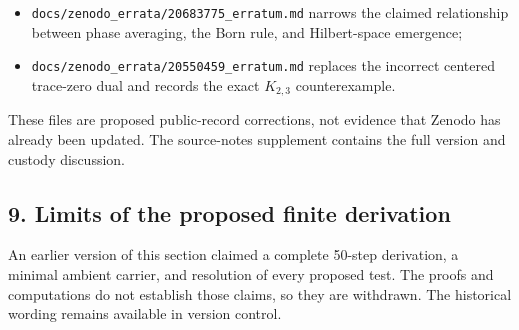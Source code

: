 \documentclass[
  11pt,
]{article}
\providecommand{\tightlist}{%
  \setlength{\itemsep}{0pt}\setlength{\parskip}{0pt}}
\begin{document}
\begin{itemize}
\tightlist
\item
  \texttt{d\allowbreak{}o\allowbreak{}c\allowbreak{}s\allowbreak{}/\allowbreak{}z\allowbreak{}e\allowbreak{}n\allowbreak{}o\allowbreak{}d\allowbreak{}o\allowbreak{}\_\allowbreak{}e\allowbreak{}r\allowbreak{}r\allowbreak{}a\allowbreak{}t\allowbreak{}a\allowbreak{}/\allowbreak{}2\allowbreak{}0\allowbreak{}6\allowbreak{}8\allowbreak{}3\allowbreak{}7\allowbreak{}7\allowbreak{}5\allowbreak{}\_\allowbreak{}e\allowbreak{}r\allowbreak{}r\allowbreak{}a\allowbreak{}t\allowbreak{}u\allowbreak{}m\allowbreak{}.\allowbreak{}m\allowbreak{}d}
  narrows the claimed relationship between phase averaging, the Born
  rule, and Hilbert-space emergence;
\item
  \texttt{d\allowbreak{}o\allowbreak{}c\allowbreak{}s\allowbreak{}/\allowbreak{}z\allowbreak{}e\allowbreak{}n\allowbreak{}o\allowbreak{}d\allowbreak{}o\allowbreak{}\_\allowbreak{}e\allowbreak{}r\allowbreak{}r\allowbreak{}a\allowbreak{}t\allowbreak{}a\allowbreak{}/\allowbreak{}2\allowbreak{}0\allowbreak{}5\allowbreak{}5\allowbreak{}0\allowbreak{}4\allowbreak{}5\allowbreak{}9\allowbreak{}\_\allowbreak{}e\allowbreak{}r\allowbreak{}r\allowbreak{}a\allowbreak{}t\allowbreak{}u\allowbreak{}m\allowbreak{}.\allowbreak{}m\allowbreak{}d}
  replaces the incorrect centered trace-zero dual and records the exact
  \(K_{2,3}\) counterexample.
\end{itemize}

These files are proposed public-record corrections, not evidence that
Zenodo has already been updated. The source-notes supplement contains
the full version and custody discussion.

\subsection{9. Limits of the proposed finite
derivation}\label{limits-of-the-proposed-finite-derivation}

An earlier version of this section claimed a complete 50-step
derivation, a minimal ambient carrier, and resolution of every proposed
test. The proofs and computations do not establish those claims, so they
are withdrawn. The historical wording remains available in version
control.
\end{document}
